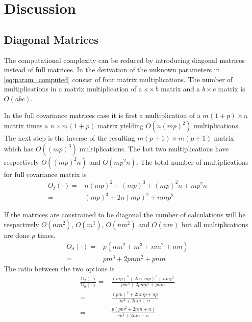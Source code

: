 \chapter{Discussion} %
\label{cha:discussion}

\section{Diagonal Matrices} %
\label{sec:diagonal_matrices}
The computational complexity can be reduced by introducing diagonal matrices instead of full matrices. In the derivation of the unknown parameters in \eqref{eq:param_computed} consist of four matrix multiplications. The number of multiplications in a matrix multiplication of a $a\times b$ matrix and a $b\times c$ matrix is $O(abc)$.

In the full covariance matrices case it is first a multiplication of a $m(1+p)\times n$ matrix times a $n\times m(1+p)$ matrix yielding $O(n(mp)^2)$ multiplications. The next step is the inverse of the resulting $m(p+1)\times m(p+1)$ matrix which has $O((mp)^3)$ multiplications. The last two multiplications have respectively $O((mp)^2n)$ and $O(mp^2n)$. The total number of multiplications for full covariance matrix is
\begin{equation}
	\begin{split}
		O_f(\cdot) = & n(mp)^2 + (mp)^3 + (mp)^2n + mp^2n \\
		= & (mp)^3 + 2n(mp)^2 + nmp^2
	\end{split}
\end{equation}

If the matrices are constrained to be diagonal the number of calculations will be respectively $O(nm^2)$, $O(m^3)$, $O(nm^2)$ and $O(nm)$ but all multiplications are done $p$ times.
\begin{equation}
	\begin{split}
		O_d(\cdot) = & p(nm^2 + m^3 + nm^2 + mn) \\
		= & pm^3 + 2pnm^2 + pnm
	\end{split}
\end{equation}
The ratio between the two options is
\begin{equation}
	\begin{split}
		\frac{O_f(\cdot)}{O_d(\cdot)} = & \frac{(mp)^3 + 2n(mp)^2 + nmp^2}{pm^3 + 2pnm^2 + pnm} \\
		= & \frac{(pm)^2 + 2nmp + np}{m^2 + 2nm + n} \\
		= & \frac{p(pm^2 + 2nm + n)}{m^2 + 2nm + n}
	\end{split}
\end{equation}

